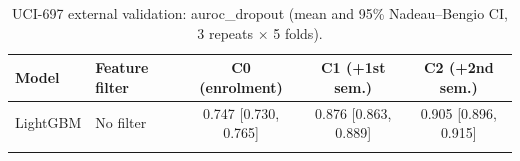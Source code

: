 \begin{table}[t]
\centering
\small
\caption{UCI-697 external validation: auroc\_dropout (mean and 95\% Nadeau--Bengio CI, 3 repeats $\times$ 5 folds).}
\label{tab:uci697_auroc_dropout}
\begin{tabular}{llccc}
\toprule
Model & Feature filter & C0 (enrolment) & C1 (+1st sem.) & C2 (+2nd sem.) \\
\midrule
LightGBM & No filter & 0.747 [0.730, 0.765] & 0.876 [0.863, 0.889] & 0.905 [0.896, 0.915] \\
\addlinespace
\bottomrule
\end{tabular}
\end{table}